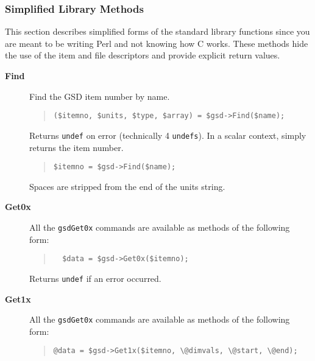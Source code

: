 \documentclass[twoside,11pt]{article}
\newenvironment{myquote}{\begin{quote}\begin{small}}{\end{small}\end{quote}}
\renewcommand{\_}{\texttt{\symbol{95}}}
\begin{document}
\subsubsection{Simplified Library Methods\label{Simplified_Library_Methods}}

This section describes simplified forms of the standard library
functions since you are meant to be writing Perl and not knowing
how C works. These methods hide the use of the item and file
descriptors and provide explicit return values.

\begin{description}
\item[\textbf{Find}] \mbox{}

Find the GSD item number by name.

\begin{myquote}
\begin{verbatim}
($itemno, $units, $type, $array) = $gsd->Find($name);
\end{verbatim}
\end{myquote}

Returns \texttt{undef} on error (technically 4 \texttt{undefs}).
In a scalar context, simply returns the item number.

\begin{myquote}
\begin{verbatim}
$itemno = $gsd->Find($name);
\end{verbatim}
\end{myquote} %

Spaces are stripped from the end of the units string.

\item[\textbf{Get0x}] \mbox{}

All the \texttt{gsdGet0x} commands are available as methods of the following
form:

\begin{myquote}
\begin{verbatim}
  $data = $gsd->Get0x($itemno);
\end{verbatim}
\end{myquote} %

Returns \texttt{undef} if an error occurred.

\item[\textbf{Get1x}] \mbox{}

  All the \texttt{gsdGet0x} commands are available as methods of the following
  form:

\begin{myquote}
\begin{verbatim}
@data = $gsd->Get1x($itemno, \@dimvals, \@start, \@end);
\end{verbatim}
\end{myquote} %



\end{description}
\end{document}
